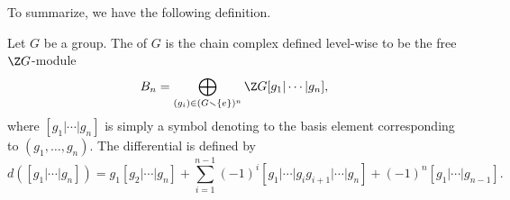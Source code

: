 \documentclass[main.tex]{subfiles}
\begin{document}
To summarize, we have the following definition.

\begin{definition}
  \label{def:bar_complex_for_groups}
  Let $G$ be a group. The  of $G$ is the chain complex defined level-wise to be the free $\Z G$-module
  \begin{equation*}
    B_{n} = \bigoplus_{(g_{i}) \in (G \smallsetminus \{e\})^{n}} \Z G[g_{1} | \cdots | g_{n}],
  \end{equation*}
  where $[g_{1} | \cdots | g_{n}]$ is simply a symbol denoting to the basis element corresponding to $(g_{1}, \dots, g_{n})$. The differential is defined by
  \begin{equation*}
    d([g_{1} | \cdots | g_{n}]) = g_{1}[g_{2} | \cdots | g_{n}] + \sum_{i = 1}^{n - 1} (-1)^{i} [g_{1} | \cdots | g_{i}g_{i+1} | \cdots | g_{n}] + (-1)^{n}[g_{1} | \cdots | g_{n-1}].
  \end{equation*}
\end{definition}
\end{document}
